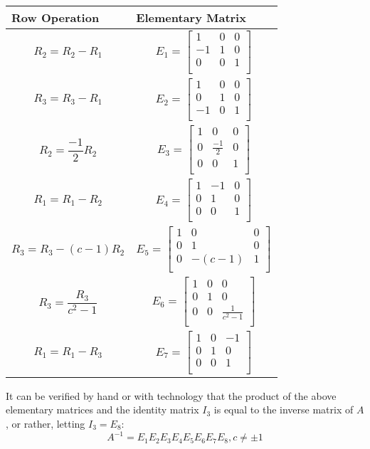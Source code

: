 \documentclass[11pt]{article}
\begin{document}
\begin{center}
\begin{tabular}{ |p{4cm}||p{4cm}| }
\hline
Row Operation & Elementary Matrix\\
\hline
$$R_2=R_2-R_1$$ &
$$E_1 = \begin{bmatrix}
1 & 0 & 0 \\
-1 & 1 & 0 \\
0 & 0 & 1 \\
\end{bmatrix}$$ \\
$$R_3 = R_3 - R_1$$ &
$$E_2 = \begin{bmatrix}
1 & 0 & 0 \\
0 & 1 & 0 \\
-1 & 0 & 1 \\
\end{bmatrix}$$  \\
$$R_2 = \frac{-1}{2}R_2$$ &
$$E_3 = \begin{bmatrix}
1 & 0 & 0 \\
0 & \frac{-1}{2} & 0 \\
0 & 0 & 1 \\
\end{bmatrix}$$  \\
$$R_1=R_1-R_2$$ &
$$E_4 = \begin{bmatrix}
1 & -1 & 0 \\
0 & 1 & 0 \\
0 & 0 & 1 \\
\end{bmatrix}$$  \\
$$R_3=R_3-(c-1)R_2$$ &
$$E_5 = \begin{bmatrix}
1 & 0 & 0 \\
0 & 1 & 0 \\
0 & -(c-1) & 1 \\
\end{bmatrix}$$  \\
$$R_3=\frac{R_3}{c^2-1}$$ &
$$E_6 = \begin{bmatrix}
1 & 0 & 0 \\
0 & 1 & 0 \\
0 & 0 & \frac{1}{c^2-1} \\
\end{bmatrix}$$  \\
$$R_1 = R_1 - R_3$$ &
$$E_7 = \begin{bmatrix}
1 & 0 & -1 \\
0 & 1 & 0 \\
0 & 0 & 1 \\
\end{bmatrix}$$  \\
\hline
\end{tabular}
\end{center}
It can be verified by hand or with technology that the product of the above elementary matrices and the identity matrix $I_3$ is equal to the inverse matrix of $A$, or rather, letting $I_3=E_8$:
$$A^{-1}=E_1E_2E_3E_4E_5E_6E_7E_8, c\neq \pm 1$$
\end{document}
